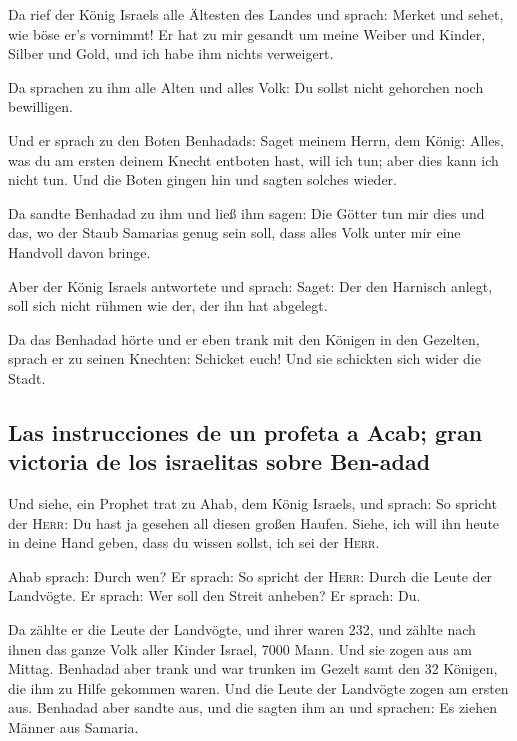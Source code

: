  Da rief der König Israels alle Ältesten des Landes und
sprach: Merket und sehet, wie böse er's vornimmt! Er hat zu mir gesandt
um meine Weiber und Kinder, Silber und Gold, und ich habe ihm nichts
verweigert.

 Da sprachen zu ihm alle Alten und alles Volk: Du sollst
nicht gehorchen noch bewilligen.

 Und er sprach zu den Boten Benhadads: Saget meinem Herrn,
dem König: Alles, was du am ersten deinem Knecht entboten hast, will ich
tun; aber dies kann ich nicht tun. Und die Boten gingen hin und sagten
solches wieder.

 Da sandte Benhadad zu ihm und ließ ihm sagen: Die Götter
tun mir dies und das, wo der Staub Samarias genug sein soll, dass alles
Volk unter mir eine Handvoll davon bringe.

 Aber der König Israels antwortete und sprach: Saget: Der
den Harnisch anlegt, soll sich nicht rühmen wie der, der ihn hat
abgelegt.

 Da das Benhadad hörte und er eben trank mit den Königen
in den Gezelten, sprach er zu seinen Knechten: Schicket euch! Und sie
schickten sich wider die Stadt.

\hypertarget{las-instrucciones-de-un-profeta-a-acab-gran-victoria-de-los-israelitas-sobre-ben-adad}{%
\subsection{Las instrucciones de un profeta a Acab; gran victoria de los
israelitas sobre
Ben-adad}\label{las-instrucciones-de-un-profeta-a-acab-gran-victoria-de-los-israelitas-sobre-ben-adad}}

 Und siehe, ein Prophet trat zu Ahab, dem König Israels,
und sprach: So spricht der \textsc{Herr}: Du hast ja gesehen all diesen
großen Haufen. Siehe, ich will ihn heute in deine Hand geben, dass du
wissen sollst, ich sei der \textsc{Herr}.

 Ahab sprach: Durch wen? Er sprach: So spricht der
\textsc{Herr}: Durch die Leute der Landvögte. Er sprach: Wer soll den
Streit anheben? Er sprach: Du.

 Da zählte er die Leute der Landvögte, und ihrer waren
232, und zählte nach ihnen das ganze Volk aller Kinder Israel, 7000
Mann.  Und sie zogen aus am Mittag. Benhadad aber trank
und war trunken im Gezelt samt den 32 Königen, die ihm zu Hilfe gekommen
waren.  Und die Leute der Landvögte zogen am ersten aus.
Benhadad aber sandte aus, und die sagten ihm an und sprachen: Es ziehen
Männer aus Samaria.

